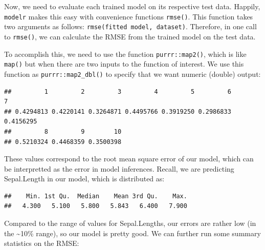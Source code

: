 \documentclass[]{article}
\newenvironment{Shaded}{\begin{snugshade}}{\end{snugshade}}
\newcommand{\KeywordTok}[1]{\textcolor[rgb]{0.13,0.29,0.53}{\textbf{#1}}}
\newcommand{\StringTok}[1]{\textcolor[rgb]{0.31,0.60,0.02}{#1}}
\newcommand{\OperatorTok}[1]{\textcolor[rgb]{0.81,0.36,0.00}{\textbf{#1}}}
\newcommand{\NormalTok}[1]{#1}
\begin{document}
Now, we need to evaluate each trained model on its respective test data.
Happily, \texttt{modelr} makes this easy with convenience functions
\texttt{rmse()}. This function takes two arguments as follows:
\texttt{rmse(fitted\ model,\ dataset)}. Therefore, in one call to
\texttt{rmse()}, we can calculate the RMSE from the trained model on the
test data.

To accomplish this, we need to use the function \texttt{purrr::map2()},
which is like \texttt{map()} but when there are two inputs to the
function of interest. We use this function as
\texttt{purrr::map2\_dbl()} to specify that we want numeric (double)
output:

\begin{Shaded}
\end{Shaded}

\begin{verbatim}
##         1         2         3         4         5         6         7 
## 0.4294813 0.4220141 0.3264871 0.4495766 0.3919250 0.2986833 0.4156295 
##         8         9        10 
## 0.5210324 0.4468359 0.3500398
\end{verbatim}

These values correspond to the root mean square error of our model,
which can be interpretted as the error in model inferences. Recall, we
are predicting Sepal.Length in our model, which is distributed as:

\begin{Shaded}
\end{Shaded}

\begin{verbatim}
##    Min. 1st Qu.  Median    Mean 3rd Qu.    Max. 
##   4.300   5.100   5.800   5.843   6.400   7.900
\end{verbatim}

Compared to the range of values for Sepal.Lengths, our errors are rather
low (in the \textasciitilde{}10\% range), so our model is pretty good.
We can further run some summary statistics on the RMSE:
\end{document}
